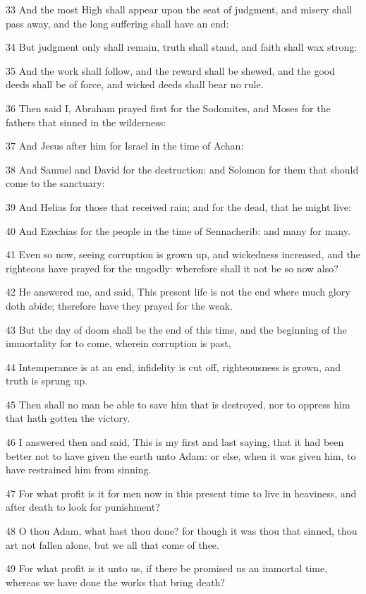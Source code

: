 \par 33 And the most High shall appear upon the seat of judgment, and misery shall pass away, and the long suffering shall have an end:
\par 34 But judgment only shall remain, truth shall stand, and faith shall wax strong:
\par 35 And the work shall follow, and the reward shall be shewed, and the good deeds shall be of force, and wicked deeds shall bear no rule.
\par 36 Then said I, Abraham prayed first for the Sodomites, and Moses for the fathers that sinned in the wilderness:
\par 37 And Jesus after him for Israel in the time of Achan:
\par 38 And Samuel and David for the destruction: and Solomon for them that should come to the sanctuary:
\par 39 And Helias for those that received rain; and for the dead, that he might live:
\par 40 And Ezechias for the people in the time of Sennacherib: and many for many.
\par 41 Even so now, seeing corruption is grown up, and wickedness increased, and the righteous have prayed for the ungodly: wherefore shall it not be so now also?
\par 42 He answered me, and said, This present life is not the end where much glory doth abide; therefore have they prayed for the weak.
\par 43 But the day of doom shall be the end of this time, and the beginning of the immortality for to come, wherein corruption is past,
\par 44 Intemperance is at an end, infidelity is cut off, righteousness is grown, and truth is sprung up.
\par 45 Then shall no man be able to save him that is destroyed, nor to oppress him that hath gotten the victory.
\par 46 I answered then and said, This is my first and last saying, that it had been better not to have given the earth unto Adam: or else, when it was given him, to have restrained him from sinning.
\par 47 For what profit is it for men now in this present time to live in heaviness, and after death to look for punishment?
\par 48 O thou Adam, what hast thou done? for though it was thou that sinned, thou art not fallen alone, but we all that come of thee.
\par 49 For what profit is it unto us, if there be promised us an immortal time, whereas we have done the works that bring death?
